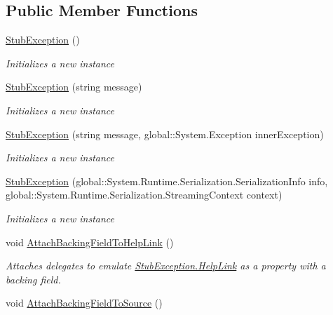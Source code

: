 \subsection*{Public Member Functions}
\begin{DoxyCompactItemize}
\item 
\hyperlink{class_system_1_1_fakes_1_1_stub_exception_acf5792e6d0e842efec692ae0d70c0743}{Stub\-Exception} ()
\begin{DoxyCompactList}\small\item\em Initializes a new instance\end{DoxyCompactList}\item 
\hyperlink{class_system_1_1_fakes_1_1_stub_exception_a73a6ef1683daec8aa67a3265c310f0c0}{Stub\-Exception} (string message)
\begin{DoxyCompactList}\small\item\em Initializes a new instance\end{DoxyCompactList}\item 
\hyperlink{class_system_1_1_fakes_1_1_stub_exception_a9a5f39dd1d96d77b56e6287bf281f47b}{Stub\-Exception} (string message, global\-::\-System.\-Exception inner\-Exception)
\begin{DoxyCompactList}\small\item\em Initializes a new instance\end{DoxyCompactList}\item 
\hyperlink{class_system_1_1_fakes_1_1_stub_exception_abbc89a78585da26e0457d6933ee9fbc7}{Stub\-Exception} (global\-::\-System.\-Runtime.\-Serialization.\-Serialization\-Info info, global\-::\-System.\-Runtime.\-Serialization.\-Streaming\-Context context)
\begin{DoxyCompactList}\small\item\em Initializes a new instance\end{DoxyCompactList}\item 
void \hyperlink{class_system_1_1_fakes_1_1_stub_exception_ac57a05076c7dc4f6b49f52e1f7cc6cd0}{Attach\-Backing\-Field\-To\-Help\-Link} ()
\begin{DoxyCompactList}\small\item\em Attaches delegates to emulate \hyperlink{class_system_1_1_fakes_1_1_stub_exception_a84faab3b7942353d443b91748ace1328}{Stub\-Exception.\-Help\-Link} as a property with a backing field.\end{DoxyCompactList}\item 
void \hyperlink{class_system_1_1_fakes_1_1_stub_exception_a43499c988f7a9a02479ece5bf1fe3418}{Attach\-Backing\-Field\-To\-Source} ()

\end{DoxyCompactItemize}
